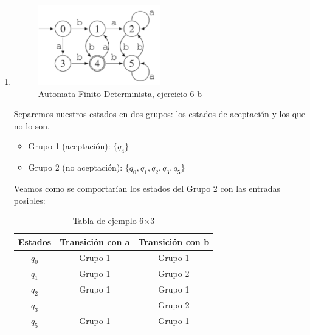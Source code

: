 \begin{enumerate}
    \item 
    \begin{figure}[ht]
        \centering
        \includegraphics[width=0.5\textwidth]{images/ejercicio6b.png}
        \caption{Automata Finito Determinista, ejercicio 6 b}
    \end{figure}
    Separemos nuestros estados en dos grupos: los estados de aceptación y los que no lo son.
    \begin{itemize}
        \item Grupo 1 (aceptación): $\{q_4\}$
        \item Grupo 2 (no aceptación): $\{q_0, q_1, q_2, q_3, q_5\}$
    \end{itemize}

    Veamos como se comportarían los estados del Grupo 2 con las entradas posibles:
    \begin{table}[ht]
    \centering
    \begin{tabular}{|c|c|c|}
    \hline
    \textbf{Estados} & \textbf{Transición con a} & \textbf{Transición con b } \\
    \hline
    $q_0$ & Grupo 1 & Grupo 1\\
    \hline
    $q_1$ & Grupo 1 & Grupo 2 \\
    \hline
    $q_2$  & Grupo 1 & Grupo 1 \\
    \hline
    $q_3$ & - & Grupo 2 \\
    \hline
    $q_5$ & Grupo 1 & Grupo 1 \\
    \hline
    \end{tabular}
    \caption{Tabla de ejemplo 6×3}
    \label{tab:ejemplo}
    \end{table}



\end{enumerate}
